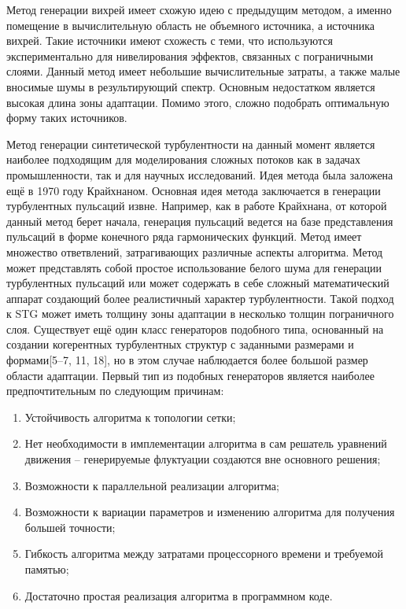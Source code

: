 Метод генерации вихрей имеет схожую идею с предыдущим методом, а именно помещение в вычислительную область не объемного источника, а источника вихрей\cite{lin1999control}. Такие источники имеют схожесть с теми, что используются экспериментально для нивелирования эффектов, связанных с пограничными слоями. Данный метод имеет небольшие вычислительные затраты, а также малые вносимые шумы в результирующий спектр. Основным недостатком является высокая длина зоны адаптации. Помимо этого, сложно подобрать оптимальную форму таких источников. 

Метод генерации синтетической турбулентности на данный момент является наиболее подходящим для моделирования сложных потоков как в задачах промышленности, так и для научных исследований. Идея метода была заложена ещё в 1970 году Крайхнаном\cite{Kraichnan70}. Основная идея метода заключается в генерации турбулентных пульсаций извне. Например, как в работе Крайхнана, от которой данный метод берет начала, генерация пульсаций ведется на базе представления пульсаций в форме конечного ряда гармонических функций. Метод имеет множество ответвлений, затрагивающих различные аспекты алгоритма\cite{adamian2011efficient, huang2010general, shur2011rapid, shur2014synthetic}. Метод может представлять собой простое использование белого шума для генерации турбулентных пульсаций или может содержать в себе сложный математический аппарат создающий более реалистичный характер турбулентности. Такой подход к STG может иметь толщину зоны адаптации в несколько толщин пограничного слоя. Существует ещё один класс генераторов подобного типа, основанный на создании когерентных турбулентных структур с заданными размерами и формами[5–7, 11, 18]\cite{jarrin2006synthetic, klein2003digital, kornev2007method, di2006synthetic, veloudis2007novel}, но в этом случае наблюдается более большой размер области адаптации. Первый тип из подобных генераторов является наиболее предпочтительным по следующим причинам: 

\begin{enumerate}
    \item Устойчивость алгоритма к топологии сетки;
    \item Нет необходимости в имплементации алгоритма в сам решатель уравнений движения – генерируемые флуктуации создаются вне основного решения;
    \item Возможности к параллельной реализации алгоритма;
    \item Возможности к вариации параметров и изменению алгоритма для получения большей точности; 
    \item Гибкость алгоритма между затратами процессорного времени и требуемой памятью; \
    \item Достаточно простая реализация алгоритма в программном коде.
\end{enumerate}   

